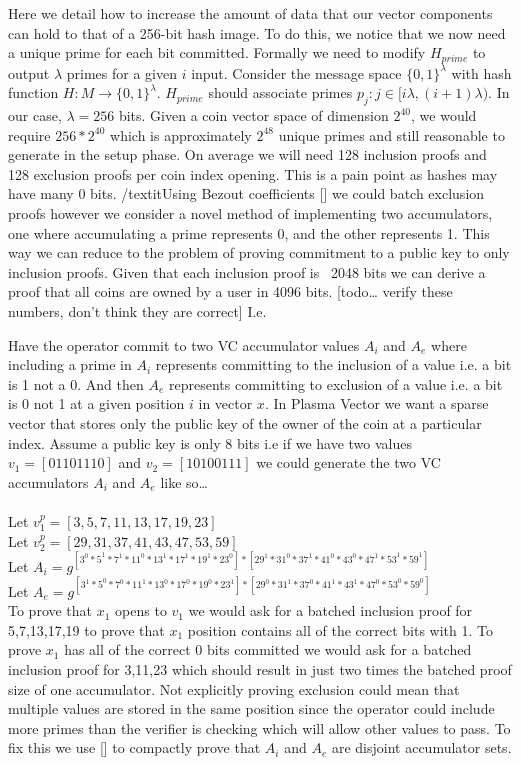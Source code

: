 \documentclass[11pt]{article}
\begin{document}
Here we detail how to increase the amount of data that our vector components can hold to that of a 256-bit hash image. To do this, we notice that we now need a unique prime for each bit committed. Formally we need to modify $H_{prime}$ to output $\lambda$ primes for a given $i$ input. Consider the message space $\{0,1\}^{\lambda}$ with hash function $H: M \rightarrow \{0,1\}^{\lambda}$. $H_{prime}$ should associate primes $p_j: j \in [i\lambda,(i+1)\lambda)$. In our case, $\lambda = 256$ bits. Given a coin vector space of dimension $2^{40}$, we would require $256*2^{40}$ which is approximately $2^{48}$ unique primes and still reasonable to generate in the setup phase. On average we will need 128 inclusion proofs and 128 exclusion proofs per coin index opening. This is a pain point as hashes may have many 0 bits. /textit{Using Bezout coefficients [] we could batch exclusion proofs however we consider a novel method of implementing two accumulators, one where accumulating a prime represents 0, and the other represents 1.} This way we can reduce to the problem of proving commitment to a public key to only inclusion proofs. Given that each inclusion proof is ~2048 bits we can derive a proof that all coins are owned by a user in 4096 bits. [todo… verify these numbers, don’t think they are correct] I.e.

Have the operator commit to two VC accumulator values $A_i$ and $A_e$ where including a prime in $A_i$ represents committing to the inclusion of a value i.e. a bit is 1 not a 0. And then $A_e$ represents committing to exclusion of a value i.e. a bit is 0 not 1 at a given position $i$ in vector $x$.
In Plasma Vector we want a sparse vector that stores only the public key of the owner of the coin at a particular index. Assume a public key is only 8 bits i.e if we have two values $v_1 = [01101110]$ and $v_2 = [10100111]$ we could generate the two VC accumulators $A_i$ and $A_e$ like so…
\\
\\
Let $v_1^p = [3,5,7,11,13,17,19,23]$
\\
Let $v_2^p = [29,31,37,41,43,47,53, 59]$
\\
Let $A_i = g^{[{3^0}*{5^1}*{7^1}*{11^0}*{13^1}*{17^1}*{19^1}*{23^0}]*[{29^1}*{31^0}*{37^1}*{41^0}*{43^0}*{47^1}*{53^1}*59^1]}$
\\
Let $A_e = g^{[{3^1}*{5^0}*{7^0}*{11^1}*{13^0}*{17^0}*{19^0}*{23^1}]*[{29^0}*{31^1}*{37^0}*{41^1}*{43^1}*{47^0}*{53^0}*59^0]}$
\\

To prove that $x_1$ opens to $v_1$ we would ask for a batched inclusion proof for 5,7,13,17,19 to prove that $x_1$ position contains all of the correct bits with 1. To prove $x_1$ has all of the correct 0 bits committed we would ask for a batched inclusion proof for 3,11,23 which should result in just two times the batched proof size of one accumulator. Not explicitly proving exclusion could mean that multiple values are stored in the same position since the operator could include more primes than the verifier is checking which will allow other values to pass. To fix this we use [] to compactly prove that $A_i$ and $A_e$ are disjoint accumulator sets.
\\
\\
\end{document}
